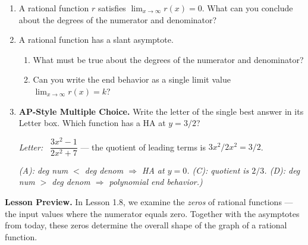 \documentclass[10pt]{article}
\begin{document}
\begin{enumerate}[itemsep=14pt]
      \rubricbox[0.28in]{\gradedblank[id=hw2, type=rubric, points=2,
  display={For large $x$, $7x^3$ dominates the numerator and $x^3$ the denominator; the other terms are negligible. The quotient of leading terms is $7x^3/x^3 = 7$, so the outputs approach 7.}]{\linewidth}{56pt}}

\item A rational function $r$ satisfies $\displaystyle\lim_{x \to \infty} r(x) = 0$.
What can you conclude about the degrees of the numerator and denominator?

\rubricbox[0.28in]{\gradedblank[id=hw3, type=rubric, points=2,
  display={The numerator's degree is strictly less than the denominator's: the denominator dominates, so the quotient of leading terms approaches 0.}]{\linewidth}{38pt}}

\item A rational function has a slant asymptote.

\begin{enumerate}[label=(\alph*), itemsep=6pt]
  \item What must be true about the degrees of the numerator and denominator?

        \rubricbox[0.1in]{\gradedblank[id=hw4a, type=rubric, points=1,
  display={deg numerator $=$ deg denominator $+ 1$.}]{\linewidth}{16pt}}

  \item Can you write the end behavior as a single limit value $\lim_{x\to\infty} r(x) = k$?

        \rubricbox[0.1in]{\gradedblank[id=hw4b, type=rubric, points=2,
  display={No. The quotient of leading terms is a non-constant linear expression, so the outputs grow without bound: $\lim_{x\to\infty} r(x) = \pm\infty$.}]{\linewidth}{34pt}}
\end{enumerate}

\item \textbf{AP-Style Multiple Choice.} Write the letter of the single best answer in its Letter box. Which function has a HA at $y = 3/2$?

\textit{Letter:}~\gradedblank[id=hw5, type=choice, points=1, answer=B]{0.42in}{13pt} $\dfrac{3x^2 - 1}{2x^2 + 7}$ --- the quotient of leading terms is $3x^2/2x^2 = 3/2$.

\textit{(A): deg num $<$ deg denom $\Rightarrow$ HA at $y = 0$.
(C): quotient is $2/3$.
(D): deg num $>$ deg denom $\Rightarrow$ polynomial end behavior.)}

\end{enumerate}

\vspace{0.1in}

\begin{reflectionbox}
\textbf{Lesson Preview.} In Lesson 1.8, we examine the \textit{zeros} of rational functions ---
the input values where the numerator equals zero.  Together with the asymptotes from today,
these zeros determine the overall shape of the graph of a rational function.
\end{reflectionbox}
\end{document}
